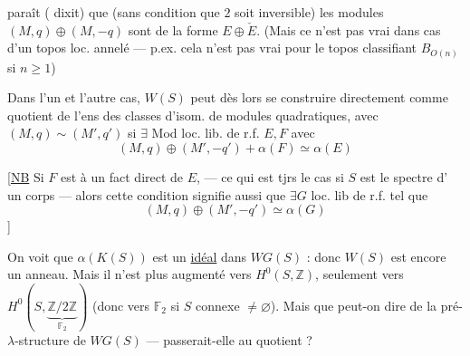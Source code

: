 paraît ( dixit) que (sans condition que
$2$ soit inversible) les modules $(M,q)\oplus(M,-q)$
sont de la forme  $E\oplus\check E$. (Mais ce n'est pas
vrai dans   cas d'un topos loc. annelé —
p.ex. cela n'est pas vrai pour le topos classifiant
$B_{O(n)}$ si $n\ge1$)

Dans l'un et l'autre cas, $W(S)$ peut
dès lors se construire directement comme
quotient de l'ens des classes d'isom.
de modules quadratiques, avec
$(M,q)\sim(M',q')$ si 
 
$\exists$ Mod loc. lib. de r.f. $E,F$ avec
\[
(M,q)\oplus(M',-q')+\alpha(F)\simeq\alpha(E)
\]

[\uline{NB} Si $F$ est  à un fact direct de $E$,
— ce qui est tjrs le cas si $S$ est le spectre d'
un corps —  alors cette condition signifie
aussi que $\exists G$ loc. lib de r.f. tel que
\[
(M,q)\oplus(M',-q')\simeq\alpha(G)
\]
]

On voit que $\alpha(K(S))$ est un \uline{idéal} dans
$WG(S)$ : donc $W(S)$ est encore un anneau.
Mais il n'est plus augmenté vers $H^0(S,\mathbb Z)$,
seulement vers $H^0(S,\underbrace{\mathbb Z/2\mathbb Z}_{\mathbb F_2})$ (donc vers
$\mathbb F_2$ si $S$ connexe $\ne\varnothing$). Mais que peut-on
dire de la pré-$\lambda$-structure de $WG(S)$
— passerait-elle au quotient ?


